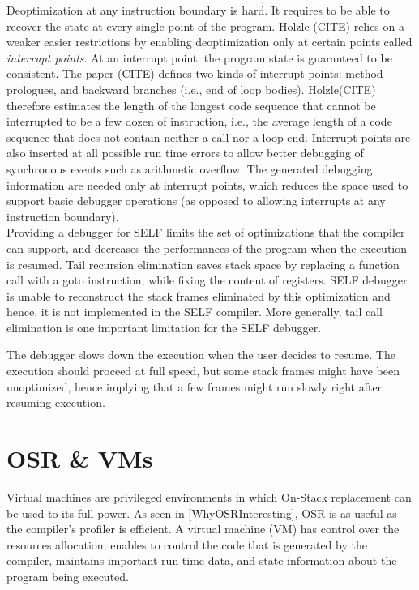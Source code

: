 Deoptimization at any instruction boundary is hard. 
It requires to be able to recover the state at every single point of the program.
Holzle (CITE) relies on a weaker easier restrictions by enabling deoptimization only at certain points called \textit{interrupt points}. 
At an interrupt point, the program state is guaranteed to be consistent. 
The paper (CITE) defines two kinds of interrupt points: method prologues, and backward branches (i.e., end of loop bodies).
Holzle(CITE) therefore estimates the length of the longest code sequence that cannot be interrupted to be a few dozen of instruction, i.e., the average length of a code sequence that does not contain neither a call nor a loop end.
Interrupt points are also inserted at all possible run time errors to allow better debugging of synchronous events such as arithmetic overflow. 
The generated debugging information are needed only at interrupt points, which reduces the space used to support basic debugger operations (as opposed to allowing interrupts at any instruction boundary).\\

Providing a debugger for SELF limits the set of optimizations that the compiler can support, and decreases the performances of the program when the execution is resumed. 
Tail recursion elimination saves stack space by replacing a function call with a goto instruction, while fixing the content of registers.
SELF debugger is unable to reconstruct the stack frames eliminated by this optimization and hence, it is not implemented in the SELF compiler.
More generally, tail call elimination is one important limitation for the SELF debugger.

The debugger slows down the execution when the user decides to resume. 
The execution should proceed at full speed, but some stack frames might have been unoptimized, hence implying that a few frames might run slowly right after resuming execution.\\

\section{OSR \& VMs}
Virtual machines are privileged environments in which On-Stack replacement can be used to its full power.
As seen in \ref{WhyOSRInteresting}, OSR is as useful as the compiler's profiler is efficient.
A virtual machine (VM) has control over the resources allocation, enables to control the code that is generated by the compiler, maintains important run time data, and state information about the program being executed.\\

